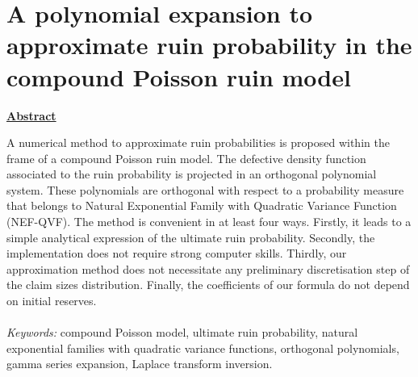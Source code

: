 
\chapter{A polynomial expansion to approximate ruin probability in the compound Poisson ruin model}\label{Chapter4}
	\minitoc
	\newpage




\begin{center}
\Large{\underline{\textbf{Abstract}}}\\
\end{center}
A numerical method to approximate ruin probabilities is proposed within the frame of a compound Poisson ruin model. The defective density function associated to the ruin probability is projected in an orthogonal polynomial system. These polynomials are orthogonal with respect to a probability measure that belongs to Natural Exponential Family with Quadratic Variance Function (NEF-QVF). The method is convenient in at least four ways. Firstly, it leads to a simple analytical expression of the ultimate ruin probability. Secondly, the implementation does not require strong computer skills. Thirdly, our approximation method does not necessitate any preliminary discretisation step of the claim sizes distribution. Finally, the coefficients of our formula do not depend on initial reserves. \\
\\
\textit{Keywords:} compound Poisson model, ultimate ruin probability, natural exponential families with quadratic variance functions, orthogonal polynomials, gamma series expansion, Laplace transform inversion.
